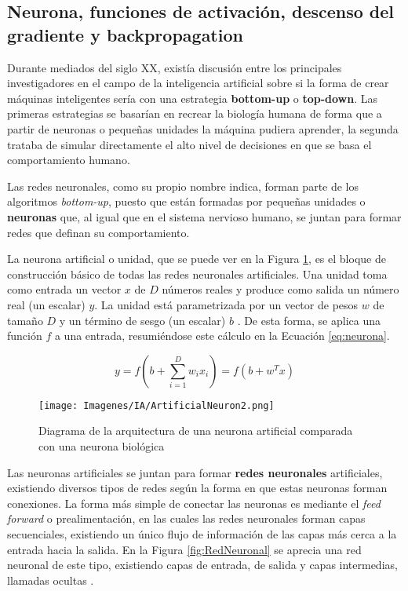 \documentclass{report}
\begin{document}
\subsection{ Neurona, funciones de activación, descenso del gradiente y backpropagation } \label{DescensoDelGradiente}

Durante mediados del siglo XX, existía discusión entre los principales investigadores en el campo de la inteligencia artificial sobre si la forma de crear máquinas inteligentes sería con una estrategia \textbf{bottom-up} o \textbf{top-down}. Las primeras estrategias se basarían en recrear la biología humana de forma que a partir de neuronas o pequeñas unidades la máquina pudiera aprender, la segunda trataba de simular directamente el alto nivel de decisiones en que se basa el comportamiento humano.

Las redes neuronales, como su propio nombre indica, forman parte de los algoritmos \textit{bottom-up}, puesto que están formadas por pequeñas unidades o \textbf{neuronas} que, al igual que en el sistema nervioso humano, se juntan para formar redes que definan su comportamiento.


La neurona artificial o unidad, que se puede ver en la Figura \ref{fig:neurona}, es el bloque de construcción básico de todas las redes neuronales artificiales. Una unidad toma como entrada un vector $x$ de $D$ números reales y produce como salida un número real (un escalar) $y$. La unidad está parametrizada por un vector de pesos $w$ de tamaño $D$ y un término de sesgo (un escalar) $b$ \cite{EzequielFundamentals}. De esta forma, se aplica una función $f$ a una entrada, resumiéndose este cálculo en la Ecuación \ref{eq:neurona}.

\begin{equation}
    y = f \left( b+\sum_{i=1}^{D} w_i x_{i} \right) = f \left( b + w^T x \right)
    \label{eq:neurona}
\end{equation}


\vspace{0.4cm}
\begin{figure}[H]
    \centering
    \texttt{[image: Imagenes/IA/ArtificialNeuron2.png]}
    \caption{ Diagrama de la arquitectura de una neurona artificial comparada con una neurona biológica }
    \label{fig:neurona}
\end{figure}
\vspace{0.4cm}

Las neuronas artificiales se juntan para formar \textbf{redes neuronales} artificiales, existiendo diversos tipos de redes según la forma en que estas neuronas forman conexiones. La forma más simple de conectar las neuronas es mediante el \textit{feed forward} o prealimentación, en las cuales las redes neuronales forman capas secuenciales, existiendo un único flujo de información de las capas más cerca a la entrada hacia la salida. En la Figura \ref{fig:RedNeuronal} se aprecia una red neuronal de este tipo, existiendo capas de entrada, de salida y capas intermedias, llamadas ocultas \cite{EzequielFundamentals}. 
\end{document}
